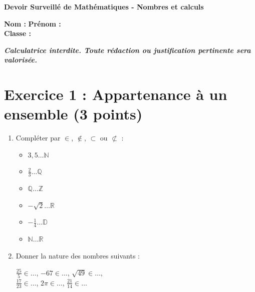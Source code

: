 \documentclass[12pt,a4paper]{article}
\begin{document}
\centering\textbf{Devoir Surveill\'e de Math\'ematiques - Nombres et calculs}\\
\vspace{0.5cm}

\noindent\textbf{Nom :} \underline{\hspace{5cm}} \hfill \textbf{Pr\'enom :} \underline{\hspace{5cm}} \\
\textbf{Classe :} \underline{\hspace{5cm}}\\
\vspace{1cm}

\centering\textit{\textbf{Calculatrice interdite. Toute r\'edaction ou justification pertinente sera valoris\'ee.}}

\section*{Exercice 1 : Appartenance \`a un ensemble (3 points)}

\begin{enumerate}
    \item Compl\'eter par \(\in\), \(\notin\), \(\subset\) ou \(\not\subset\) :
    \begin{tcolorbox}[colframe=black, colback=white, width=\linewidth]
    \begin{itemize}
        \item \(3,5 \ldots \mathbb{N}\)\\[0.2cm]
        \item \(\frac{2}{3} \ldots \mathbb{Q}\)\\[0.2cm]
        \item \(\mathbb{Q} \ldots \mathbb{Z}\)\\[0.2cm]
        \item \(-\sqrt{2} \ldots \mathbb{R}\)\\[0.2cm]
        \item \(-\frac{1}{4} \ldots \mathbb{D}\)\\[0.2cm]
        \item \(\mathbb{N} \ldots \mathbb{R}\)
    \end{itemize}
    \end{tcolorbox}

    \item Donner la nature des nombres suivants :
    \begin{tcolorbox}[colframe=black, colback=white, width=\linewidth]
    \(\frac{25}{5}\in \ldots \), \( -67 \in \ldots \), \( \sqrt{49} \in \ldots \), \\
    \( \frac{17}{23} \in \ldots \), \( 2\pi \in \ldots \), \( \frac{21}{14} \in \ldots \)
    \end{tcolorbox}
\end{enumerate}
\end{document}
